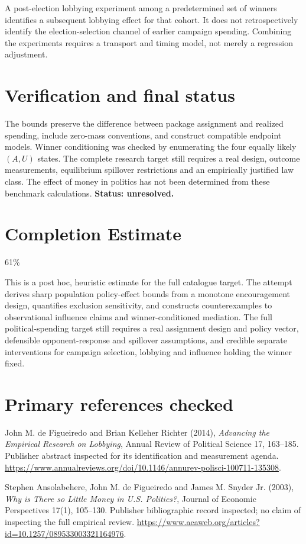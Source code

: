 \documentclass[11pt]{article}
\begin{document}
A post-election lobbying experiment among a predetermined set of winners identifies a subsequent lobbying effect for that cohort. It does not retrospectively identify the election-selection channel of earlier campaign spending. Combining the experiments requires a transport and timing model, not merely a regression adjustment.

\section*{Verification and final status}
The bounds preserve the difference between package assignment and realized spending, include zero-mass conventions, and construct compatible endpoint models. Winner conditioning was checked by enumerating the four equally likely $(A,U)$ states. The complete research target still requires a real design, outcome measurements, equilibrium spillover restrictions and an empirically justified law class. The effect of money in politics has not been determined from these benchmark calculations. \textbf{Status: unresolved.}

\section{Completion Estimate}
61\%

This is a post hoc, heuristic estimate for the full catalogue target.
The attempt derives sharp population policy-effect bounds from a monotone encouragement design, quantifies exclusion sensitivity, and constructs counterexamples to observational influence claims and winner-conditioned mediation. The full political-spending target still requires a real assignment design and policy vector, defensible opponent-response and spillover assumptions, and credible separate interventions for campaign selection, lobbying and influence holding the winner fixed.

\section*{Primary references checked}
John M. de Figueiredo and Brian Kelleher Richter (2014), \emph{Advancing the Empirical Research on Lobbying}, Annual Review of Political Science 17, 163--185. Publisher abstract inspected for its identification and measurement agenda. \url{https://www.annualreviews.org/doi/10.1146/annurev-polisci-100711-135308}.

Stephen Ansolabehere, John M. de Figueiredo and James M. Snyder Jr. (2003), \emph{Why is There so Little Money in U.S. Politics?}, Journal of Economic Perspectives 17(1), 105--130. Publisher bibliographic record inspected; no claim of inspecting the full empirical review. \url{https://www.aeaweb.org/articles?id=10.1257/089533003321164976}.
\end{document}
